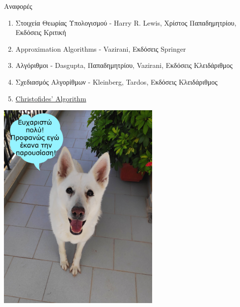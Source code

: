 \documentclass{beamer}
\begin{document}
\begin{frame}{Αναφορές}
\begin{enumerate}
    \item Στοιχεία Θεωρίας Υπολογισμού - \textlatin{Harry R. Lewis}, Χρίστος Παπαδημητρίου, Εκδόσεις Κριτική
    \item \textlatin{Approximation Algorithms - Vazirani}, Εκδόσεις \textlatin{Springer}
    \item Αλγόριθμοι - \textlatin{Dasgupta}, Παπαδημητρίου, \textlatin{Vazirani}, Εκδόσεις Κλειδάριθμος
    \item Σχεδιασμός Αλγορίθμων - \textlatin{Kleinberg, Tardos}, Εκδόσεις Κλειδάριθμος 
    \item \href{http://www.cs.cornell.edu/courses/cs681/2007fa/Handouts/christofides.pdf}{\textlatin{Christofides' Algorithm}}
    
\end{enumerate}
    
\end{frame}


\begin{frame}
\begin{center}
    \includegraphics[width=8cm]{Rea1.jpg}
\end{center}
    
\end{frame}
\end{document}
